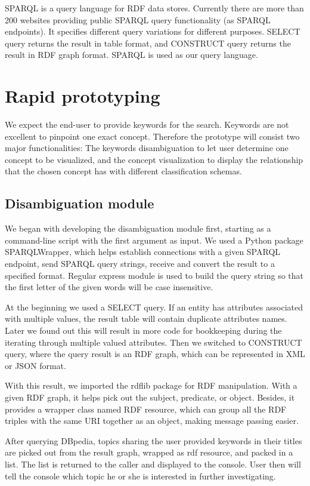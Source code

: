 \documentclass[12pt]{cls}
\begin{document}
SPARQL is a query language for RDF data stores. Currently there are more than 200 websites providing public SPARQL query functionality (as SPARQL endpoints). It specifies different query variations for different purposes. SELECT query returns the result in table format, and CONSTRUCT query returns the result in RDF graph format. SPARQL is used as our query language.

\section{Rapid prototyping}

We expect the end-user to provide keywords for the search. Keywords are not excellent to pinpoint one exact concept. Therefore the prototype will consist two major functionalities: The keywords disambiguation to let user determine one concept to be visualized, and the concept visualization to display the relationship that the chosen concept has with different classification schemas. 

\subsection{Disambiguation module}

We began with developing the disambiguation module first, starting as a command-line script with the first argument as input. We used a Python package SPARQLWrapper, which helps establish connections with a given SPARQL endpoint, send SPARQL query strings, receive and convert the result to a specified format. Regular express module is used to build the query string so that the first letter of the given words will be case insensitive.

At the beginning we used a SELECT query. If an entity has attributes associated with multiple values, the result table will contain duplicate attributes names. Later we found out this will result in more code for bookkeeping during the iterating through multiple valued attributes. Then we switched to CONSTRUCT query, where the query result is an RDF graph, which can be represented in XML or JSON format.

With this result, we imported the rdflib package for RDF manipulation. With a given RDF graph, it helps pick out the subject, predicate, or object. Besides, it provides a wrapper class named RDF resource, which can group all the RDF triples with the same URI together as an object, making message passing easier.

After querying DBpedia, topics sharing the user provided keywords in their titles are picked out from the result graph, wrapped as rdf resource, and packed in a list. The list is returned to the caller and displayed to the console. User then will tell the console which topic he or she is interested in further investigating.
\end{document}
